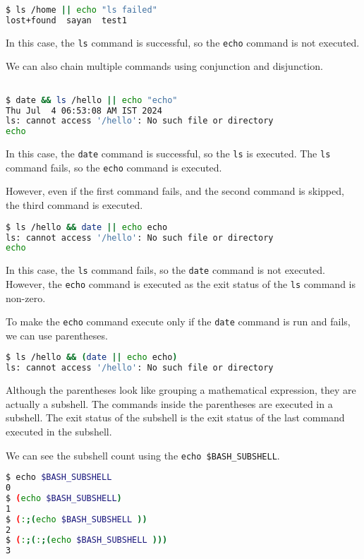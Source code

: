 \begin{lstlisting}[language=bash]
$ ls /home || echo "ls failed"
lost+found  sayan  test1
\end{lstlisting}

In this case, the \texttt{ls} command is successful, so the \texttt{echo}
command is not executed.

We can also chain multiple commands using conjunction and disjunction.

\begin{lstlisting}[language=bash]

$ date && ls /hello || echo "echo"
Thu Jul  4 06:53:08 AM IST 2024
ls: cannot access '/hello': No such file or directory
echo
\end{lstlisting}

In this case, the \texttt{date} command is successful, so the \texttt{ls}
is executed. The \texttt{ls} command fails, so the \texttt{echo} command
is executed.

However, even if the first command fails, and the second command is
skipped, the third command is executed.

\begin{lstlisting}[language=bash]
$ ls /hello && date || echo echo
ls: cannot access '/hello': No such file or directory
echo
\end{lstlisting}

In this case, the \texttt{ls} command fails, so the \texttt{date} command
is not executed. However, the \texttt{echo} command is executed as the
exit status of the \texttt{ls} command is non-zero.

To make the \texttt{echo} command execute only if the \texttt{date}
command is run and fails, we can use parentheses.

\begin{lstlisting}[language=bash]
$ ls /hello && (date || echo echo)
ls: cannot access '/hello': No such file or directory
\end{lstlisting}

Although the parentheses look like grouping a mathematical expression,
they are actually a subshell. The commands inside the parentheses
are executed in a subshell. The exit status of the subshell is the
exit status of the last command executed in the subshell.

We can see the subshell count using the \texttt{echo \$BASH\_SUBSHELL}.

\begin{lstlisting}[language=bash]
$ echo $BASH_SUBSHELL
0
$ (echo $BASH_SUBSHELL)
1
$ (:;(echo $BASH_SUBSHELL ))
2
$ (:;(:;(echo $BASH_SUBSHELL )))
3
\end{lstlisting}

